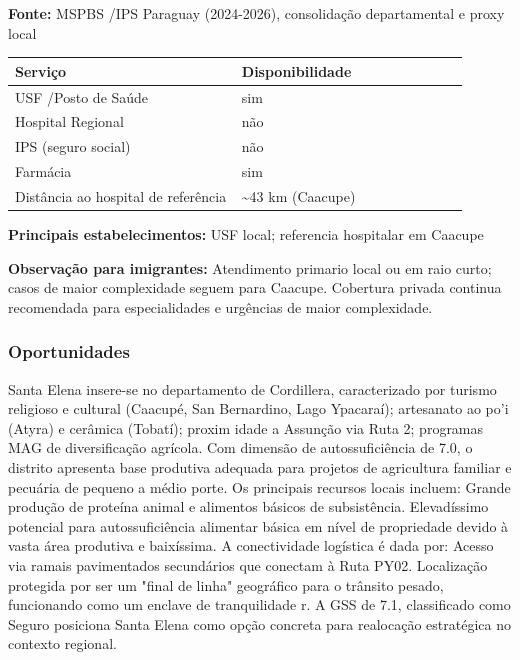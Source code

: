 \textbf{Fonte:} MSPBS /\allowbreak  IPS Paraguay (2024-2026), consolidação
departamental e proxy local

{\def\LTcaptype{none} %
\begin{longtable}{@{}>{\raggedright\arraybackslash}p{0.45\linewidth} >{\raggedright\arraybackslash}p{0.45\linewidth}@{}}
\toprule\noalign{}
Serviço & Disponibilidade \\
\midrule\noalign{}
\endhead
\bottomrule\noalign{}
\endlastfoot
USF /\allowbreak  Posto de Saúde & sim \\
Hospital Regional & não \\
IPS (seguro social) & não \\
Farmácia & sim \\
Distância ao hospital de referência & \textasciitilde43 km (Caacupe) \\
\end{longtable}
}

\textbf{Principais estabelecimentos:} USF local; referencia hospitalar
em Caacupe

\textbf{Observação para imigrantes:} Atendimento primario local ou em
raio curto; casos de maior complexidade seguem para Caacupe. Cobertura
privada continua recomendada para especialidades e urgências de maior
complexidade.
\newpage

\subsubsection*{Oportunidades}\label{oport-santa-elena-0317}
Santa Elena insere-se no departamento de Cordillera, caracterizado por turismo religioso e cultural (Caacupé, San Bernardino, Lago Ypacaraí); artesanato ao po'i (Atyra) e cerâmica (Tobatí); proxim idade a Assunção via Ruta 2; programas MAG de diversificação agrícola. Com dimensão de autossuficiência de 7.0, o distrito apresenta base produtiva adequada para projetos de agricultura familiar e pecuária de pequeno a médio porte. Os principais recursos locais incluem: Grande produção de proteína animal e alimentos básicos de subsistência. Elevadíssimo potencial para autossuficiência alimentar básica em nível de propriedade devido à vasta área produtiva e baixíssima. A conectividade logística é dada por: Acesso via ramais pavimentados secundários que conectam à Ruta PY02. Localização protegida por ser um "final de linha" geográfico para o trânsito pesado, funcionando como um enclave de tranquilidade r. A GSS de 7.1, classificado como Seguro posiciona Santa Elena como opção concreta para realocação estratégica no contexto regional.

